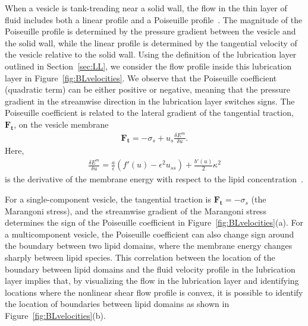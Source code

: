 \documentclass[twoside,twocolumn,9pt]{article}
\renewcommand{\tt}{\mathbf{t}}
\begin{document}
When a vesicle is tank-treading near a solid wall, the flow in the thin
layer of fluid includes both a linear profile and a Poiseuille
profile~\cite{mis-wis-ber-key-li-tun-law-per-erd-zha-zha-sun-kal-lam-kon2019}.
The magnitude of the Poiseuille profile is determined by the pressure
gradient between the vesicle and the solid wall, while the linear
profile is determined by the tangential velocity of the vesicle relative
to the solid wall. Using the definition of the lubrication layer
outlined in Section~\ref{sec:LL}, we consider the flow profile inside
this lubrication layer in Figure~\ref{fig:BLvelocities}. We observe that
the Poiseuille coefficient (quadratic term) can be either positive or
negative, meaning that the pressure gradient in the streamwise direction
in the lubrication layer switches signs. The Poiseuille coefficient is
related to the lateral gradient of the tangential traction,
$\mathbf{F}_\tt$, on the vesicle membrane~\cite{Oron1997_RMP,
Young2014_JFM}
\begin{align}
  \mathbf{F}_{\tt} = -\sigma_s + u_s \frac{\delta E^m}{\delta u}.
\end{align}
Here,
\begin{align}
  \frac{\delta E^m}{\delta u} = \frac{a}{\epsilon} 
    (f'(u) - \epsilon^2 u_{ss}) + \frac{b'(u)}{2} \kappa^2
\end{align}
is the derivative of the membrane energy with respect to the lipid
concentration~\cite{soh-tse-li-voi-low2010}. 

For a single-component vesicle,
the tangential traction is $\mathbf{F}_\tt =-\sigma_s$ (the Marangoni stress), and  the streamwise gradient 
of the Marangoni stress determines the sign of the Poiseuille coefficient in Figure~\ref{fig:BLvelocities}(a).
For a multicomponent vesicle, the Poiseuille coefficient can also change sign around the boundary 
between two lipid domains, where the membrane energy changes sharply between lipid species. 
This correlation between the location of the boundary between lipid domains and the fluid velocity profile in the lubrication layer
implies that, by visualizing the flow
in the lubrication layer and identifying locations where the nonlinear shear flow profile is convex, 
it is possible to identify the location of boundaries between lipid domains as shown in Figure~\ref{fig:BLvelocities}(b).
\end{document}
